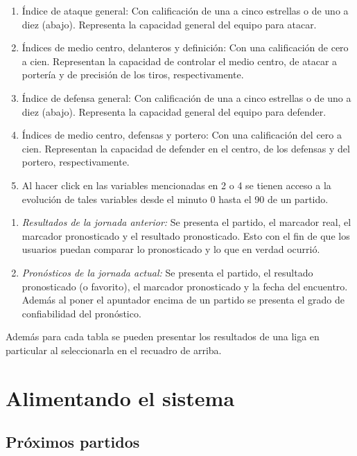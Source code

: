 \begin{enumerate}

\item Índice de ataque general: Con calificación de una a cinco estrellas o de uno a diez (abajo). Representa la capacidad general del equipo para atacar.
\item Índices de medio centro, delanteros y definición: Con una calificación de cero a cien. Representan la capacidad de controlar el medio centro, de atacar a portería y de precisión de los tiros, respectivamente.
\item Índice de defensa general: Con calificación de una a cinco estrellas o de uno a diez (abajo). Representa la capacidad general del equipo para defender.
\item Índices de medio centro, defensas y portero: Con una calificación del cero a cien. Representan la capacidad de defender en el centro, de los defensas y del portero, respectivamente.
\item Al hacer click en las variables mencionadas en 2 o 4 se tienen acceso a la evolución de tales variables desde el minuto 0 hasta el 90 de un partido.
\end{enumerate}

\begin{enumerate}

	\item \emph{Resultados de la jornada anterior:} Se presenta el partido, el marcador real, el marcador pronosticado y el resultado pronosticado. Esto con el fin de que los usuarios puedan comparar lo pronosticado y lo que en verdad ocurrió.
	\item \emph{Pronósticos de la jornada actual:} Se presenta el partido, el resultado pronosticado (o favorito), el marcador pronosticado y la fecha del encuentro. Además al poner el apuntador encima de un partido se presenta el grado de confiabilidad del pronóstico.
\end{enumerate}

Además para cada tabla se pueden presentar los resultados de una liga en particular al seleccionarla en el recuadro de arriba.

\section{Alimentando el sistema}
\label{sec:inserting-data}

\subsection{Próximos partidos}
\label{sec:next-match}

